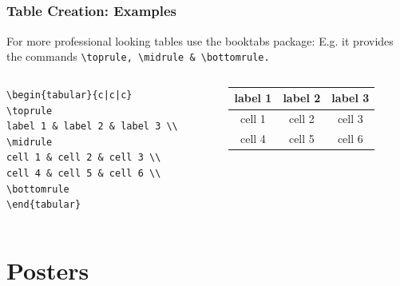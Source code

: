 \documentclass[[newPxFont]{beamer}
\begin{document}
\subsection{}
\begin{frame}[fragile]
  \frametitle{Table Creation: Examples}
  For more professional looking tables use the booktabs package:
E.g. it provides the commands \verb+\toprule, \midrule & \bottomrule.+
\begin{columns}
\begin{column}{.5\textwidth}
\begin{small}
\begin{verbatim}
\begin{tabular}{c|c|c}
\toprule
label 1 & label 2 & label 3 \\
\midrule
cell 1 & cell 2 & cell 3 \\
cell 4 & cell 5 & cell 6 \\
\bottomrule
\end{tabular}
\end{verbatim}
\end{small}
\end{column}
\begin{column}{.5\textwidth}
\begin{tabular}{c|c|c}
\toprule
label 1 & label 2 & label 3 \\
\midrule
cell 1 & cell 2 & cell 3 \\
cell 4 & cell 5 & cell 6 \\
\bottomrule
\end{tabular}
    \end{column}
  \end{columns}
\end{frame}
\section{Posters}
\end{document}
